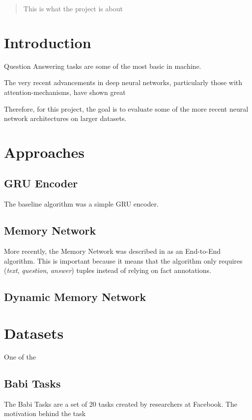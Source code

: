 \documentclass{article}
\begin{document}
\maketitle
\begin{abstract}
This is what the project is about
\end{abstract}

\section{Introduction}

Question Answering tasks are some of the most basic in machine. 


The very recent advancements in deep neural networks, particularly those with attention-mechanisms, have shown great

Therefore, for this project, the goal is to evaluate some of the more recent neural network architectures on larger datasets.  

\section{Approaches}

\subsection{GRU Encoder}

The baseline algorithm was a simple GRU encoder.   

\subsection{Memory Network}

More recently, the Memory Network was described in \cite{mem_net} as an End-to-End algorithm.  This is important because it means that the algorithm only requires (\textit{text}, \textit{question}, \textit{answer}) tuples instead of relying on fact annotations.  


\subsection{Dynamic Memory Network}


\section{Datasets}

One of the 

\subsection{Babi Tasks}

The Babi Tasks are a set of 20 tasks created by researchers at Facebook.  The motivation behind the task 






\nocite{*}


\end{document}
